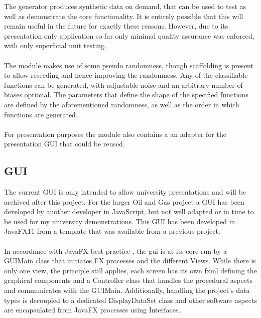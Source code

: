 \documentclass[main.tex]{subfiles}
\begin{document}
      The generator produces synthetic data on demand, that can be used to test as well as demonstrate the core functionality. It is entirely possible that this will remain useful in the future for exactly these reasons. However, due to its presentation only application so far only minimal quality assurance was enforced, with only superficial unit testing.
      \\\\
      The module makes use of some pseudo randomness, though scaffolding is present to allow reseeding and hence improving the randomness. Any of the classifiable functions can be generated, with adjustable noise and an arbitrary number of biases optional. The parameters that define the shape of the specified functions are defined by the aforementioned randomness, as well as the order in which functions are generated.
      \\\\
      For presentation purposes the module also contains a an adapter for the presentation GUI that could be reused.
      
    \subsection{GUI}
      
      The current GUI is only intended to allow university presentations and will be archived after this project. For the larger Oil and Gas project a GUI has been developed by another developer in JavaScript, but not well adapted or in time to be used for my university demonstrations. This GUI has been developed in JavaFX11 from a template that was available from a previous project.
      \\\\
      In accordance with JavaFX best practice \cite{bestPracticeFX},  the gui is at its core run by a GUIMain class that initiates FX processes and the different Views. While there is only one view, the principle still applies, each screen has its own fxml defining the graphical components and a Controller class that handles the procedural aspects and communicates with the GUIMain. Additionally, handling the project's data types is decoupled to a dedicated DisplayDataSet class and other software aspects are encapsulated from JavaFX processes using Interfaces.
      
\end{document}
